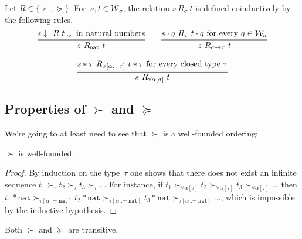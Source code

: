 \documentclass[runningheads,a4paper]{llncs}
\newcommand{\World}{\mathcal{W}}
\newcommand{\app}[2]{#1 \cdot #2}
\newcommand{\tapp}[2]{#1 * #2}
\newcommand{\subst}[2]{#1:=#2}
\newcommand{\nat}{\mathtt{nat}}
\newcommand{\da}{\downarrow}
\begin{document}
\begin{definition}\label{def:succ}
  Let $R \in \{ \succ,\succeq \}$. For~$s,t \in \World_\sigma$, the
  relation $s\ R_{\sigma}\ t$ is defined coinductively by the
  following rules.
  \[
    \begin{array}{c}
    \infer={s\ R_\nat\ t}{s\da\ R\ t\da \text{ in natural
        numbers}}\quad\quad
    \infer={s\ R_{\sigma\to\tau}\ t}{\app{s}{q}\ R_{\tau}\ \app{t}{q}
      \text{ for every } q \in \World_\sigma} \\ \\
    \infer={s\ R_{\forall\alpha[\sigma]}\ t}{\tapp{s}{\tau}\ R_{\sigma[\subst{\alpha}{\tau}]}\ \tapp{t}{\tau}
      \text{ for every closed type } \tau}
    \end{array}
  \]
\end{definition}

\subsection{Properties of $\succ$ and $\succeq$}

We're going to at least need to see that $\succ$ is a well-founded ordering:

\begin{lemma}
$\succ$ is well-founded.
\end{lemma}

\begin{proof}
  By induction on the type~$\tau$ one shows that there does not exist
  an infinite sequence
  $t_1 \succ_\tau t_2 \succ_\tau t_3 \succ_\tau \ldots$ For instance,
  if
  $t_1 \succ_{\forall\alpha[\tau]} t_2 \succ_{\forall\alpha[\tau]} t_3
  \succ_{\forall\alpha[\tau]} \ldots$ then
  $\tapp{t_1}{\nat} \succ_{\tau[\subst{\alpha}{\nat}]}
  \tapp{t_2}{\nat} \succ_{\tau[\subst{\alpha}{\nat}]} \tapp{t_3}{\nat}
  \succ_{\tau[\subst{\alpha}{\nat}]} \ldots$, which is impossible by
  the inductive hypothesis.
\end{proof}

\begin{lemma}
Both $\succ$ and $\succeq$ are transitive.
\end{lemma}
\end{document}
